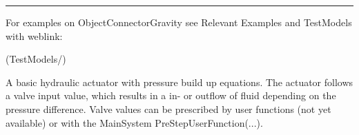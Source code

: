 \vspace{6pt}\par\noindent\rule{\textwidth}{0.4pt}
%
\noindent For examples on ObjectConnectorGravity see Relevant Examples and TestModels with weblink:
\bi
\item {} (TestModels/)

\ei

%
\newpage


\label{sec:item:ObjectConnectorHydraulicActuatorSimple}
A basic hydraulic actuator with pressure build up equations. The actuator follows a valve input value, which results in a in- or outflow of fluid depending on the pressure difference. Valve values can be prescribed by user functions (not yet available) or with the MainSystem PreStepUserFunction(...).
\vspace{12pt}\\

